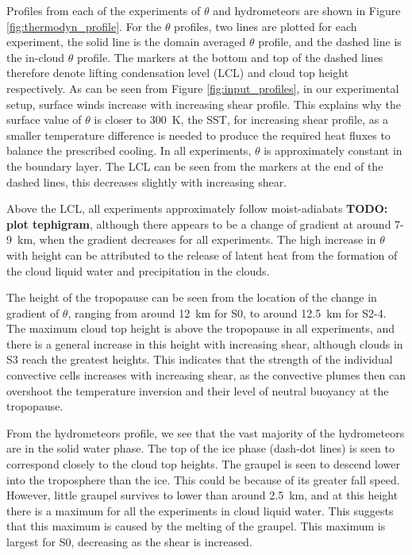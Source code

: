 \documentclass[11pt,a4paper]{article}
\newcommand\todo[1]{\textbf{TODO: #1}}
\begin{document}
Profiles from each of the experiments of $\theta$ and hydrometeors are shown in Figure \ref{fig:thermodyn_profile}. For the $\theta$ profiles, two lines are plotted for each experiment, the solid line is the domain averaged $\theta$ profile, and the dashed line is the in-cloud $\theta$ profile. The markers at the bottom and top of the dashed lines therefore denote lifting condensation level (LCL) and cloud top height respectively. As can be seen from Figure \ref{fig:input_profiles}, in our experimental setup, surface winds increase with increasing shear profile. This explains why the surface value of $\theta$ is closer to \SI{300}{K}, the SST, for increasing shear profile, as a smaller temperature difference is needed to produce the required heat fluxes to balance the prescribed cooling. In all experiments, $\theta$ is approximately constant in the boundary layer. The LCL can be seen from the markers at the end of the dashed lines, this decreases slightly with increasing shear. 

Above the LCL, all experiments approximately follow moist-adiabats \todo{plot tephigram}, although there appears to be a change of gradient at around \SI{7}{}-\SI{9}{km}, when the gradient decreases for all experiments. The high increase in $\theta$ with height can be attributed to the release of latent heat from the formation of the cloud liquid water and precipitation in the clouds.

The height of the tropopause can be seen from the location of the change in gradient of $\theta$, ranging from around \SI{12}{km} for S0, to around \SI{12.5}{km} for S2-4. The maximum cloud top height is above the tropopause in all experiments, and there is a general increase in this height with increasing shear, although clouds in S3 reach the greatest heights. This indicates that the strength of the individual convective cells increases with increasing shear, as the convective plumes then can overshoot the temperature inversion and their level of neutral buoyancy at the tropopause. 

From the hydrometeors profile, we see that the vast majority of the hydrometeors are in the solid water phase. The top of the ice phase (dash-dot lines) is seen to correspond closely to the cloud top heights. The graupel is seen to descend lower into the troposphere than the ice. This could be because of its greater fall speed. However, little graupel survives to lower than around \SI{2.5}{km}, and at this height there is a maximum for all the experiments in cloud liquid water. This suggests that this maximum is caused by the melting of the graupel. This maximum is largest for S0, decreasing as the shear is increased. 
\end{document}
